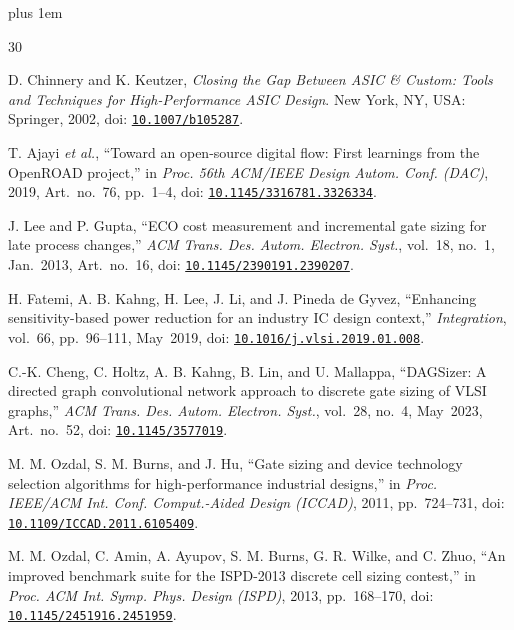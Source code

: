 \documentclass[twocolumn,10pt,fontset=windows]{ctexart}
\begin{document}
\begingroup\normalsize\linespread{1.00}\selectfont\rightskip=0pt plus 1em\relax\setlength{\parskip}{0pt}
\newcommand{\refdoi}[1]{doi: \href{https://doi.org/#1}{\nolinkurl{#1}}}
\newcommand{\refarxiv}[2]{\href{https://arxiv.org/abs/#1#2}{\nolinkurl{arXiv:#1}}}
\begin{thebibliography}{30}
\setlength{\itemsep}{1.4pt}\setlength{\parsep}{0pt}

D. Chinnery and K. Keutzer, \emph{Closing the Gap Between ASIC \& Custom: Tools and Techniques for High-Performance ASIC Design}. New York, NY, USA: Springer, 2002, \refdoi{10.1007/b105287}.

T. Ajayi \emph{et al.}, ``Toward an open-source digital flow: First learnings from the OpenROAD project,'' in \emph{Proc. 56th ACM/IEEE Design Autom. Conf. (DAC)}, 2019, Art.~no.~76, pp.~1--4, \refdoi{10.1145/3316781.3326334}.

J. Lee and P. Gupta, ``ECO cost measurement and incremental gate sizing for late process changes,'' \emph{ACM Trans. Des. Autom. Electron. Syst.}, vol.~18, no.~1, Jan.~2013, Art.~no.~16, \refdoi{10.1145/2390191.2390207}.

H. Fatemi, A. B. Kahng, H. Lee, J. Li, and J. Pineda de Gyvez, ``Enhancing sensitivity-based power reduction for an industry IC design context,'' \emph{Integration}, vol.~66, pp.~96--111, May~2019, \refdoi{10.1016/j.vlsi.2019.01.008}.

C.-K. Cheng, C. Holtz, A. B. Kahng, B. Lin, and U. Mallappa, ``DAGSizer: A directed graph convolutional network approach to discrete gate sizing of VLSI graphs,'' \emph{ACM Trans. Des. Autom. Electron. Syst.}, vol.~28, no.~4, May~2023, Art.~no.~52, \refdoi{10.1145/3577019}.

M. M. Ozdal, S. M. Burns, and J. Hu, ``Gate sizing and device technology selection algorithms for high-performance industrial designs,'' in \emph{Proc. IEEE/ACM Int. Conf. Comput.-Aided Design (ICCAD)}, 2011, pp.~724--731, \refdoi{10.1109/ICCAD.2011.6105409}.

M. M. Ozdal, C. Amin, A. Ayupov, S. M. Burns, G. R. Wilke, and C. Zhuo, ``An improved benchmark suite for the ISPD-2013 discrete cell sizing contest,'' in \emph{Proc. ACM Int. Symp. Phys. Design (ISPD)}, 2013, pp.~168--170, \refdoi{10.1145/2451916.2451959}.


\end{thebibliography}
\end{document}
